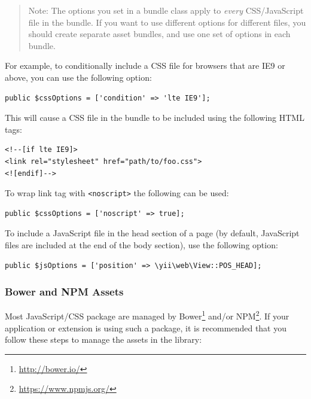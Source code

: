 \begin{quote}Note: The options you set in a bundle class apply to \textit{every} CSS/JavaScript file in the bundle. If you want to
  use different options for different files, you should create separate asset bundles, and use one set of options
  in each bundle.

\end{quote}
For example, to conditionally include a CSS file for browsers that are IE9 or above, you can use the following option:

\lstset{language=php}\begin{lstlisting}
public $cssOptions = ['condition' => 'lte IE9'];
\end{lstlisting}
This will cause a CSS file in the bundle to be included using the following HTML tags:

\lstset{language=html}\begin{lstlisting}
<!--[if lte IE9]>
<link rel="stylesheet" href="path/to/foo.css">
<![endif]-->
\end{lstlisting}
To wrap link tag with \lstinline|<noscript>| the following can be used:

\lstset{language=php}\begin{lstlisting}
public $cssOptions = ['noscript' => true];
\end{lstlisting}
To include a JavaScript file in the head section of a page (by default, JavaScript files are included at the end
of the body section), use the following option:

\lstset{language=php}\begin{lstlisting}
public $jsOptions = ['position' => \yii\web\View::POS_HEAD];
\end{lstlisting}
\subsubsection{Bower and NPM Assets \label{structure-assets.md::bower-npm-assets}}
Most JavaScript/CSS package are managed by Bower\footnote{\url{http://bower.io/}} and/or NPM\footnote{\url{https://www.npmjs.org/}}.
If your application or extension is using such a package, it is recommended that you follow these steps to manage
the assets in the library:

